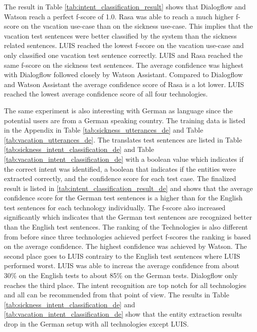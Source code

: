 The result in Table \ref{tab:intent_classification_result} shows that 
Dialogflow and Watson reach a perfect f-score of 1.0.
Rasa was able to reach a much higher f-score on the vacation use-case than 
on the sickness use-case.
This implies that the vacation test sentences were better classified by the system than
the sickness related sentences. 
LUIS reached the lowest f-score on the vacation use-case and only 
classified one vacation test sentence correctly.
LUIS and Rasa reached the same f-score on the sickness test sentences.
The average confidence was highest with Dialogflow followed 
closely by Watson Assistant.
Compared to Dialogflow and Watson Assistant the average confidence
score of Rasa is a lot lower.
LUIS reached the lowest average confidence score of all four technologies.

The same experiment is also interesting with German as language since the potential 
users are from a German speaking country.
The training data is listed in the Appendix in Table \ref{tab:sickness_utterances_de} and 
Table \ref{tab:vacation_utterances_de}.
The translates test sentences are listed in Table \ref{tab:sickness_intent_classification_de} 
and Table \ref{tab:vacation_intent_classification_de} with a boolean value which indicates if the 
correct intent was identified, a boolean that indicates if the entities were extracted correctly,
and the confidence score for each test case.
The finalized result is listed in \ref{tab:intent_classification_result_de} and shows 
that the average confidence score for the German test sentences is a higher than 
for the English test sentences for each technology individually.
The f-score also increased significantly which indicates that the German test sentences are 
recognized better than the English test sentences.
The ranking of the Technologies is also different from before since three technologies 
achieved perfect f-scores the ranking is based on the average confidence.
The highest confidence was achieved by Watson.
The second place goes to LUIS contrairy to the 
English test sentences where LUIS performed worst.
LUIS was able to increas the average confidence from about 30\% on the English tests 
to about 85\% on the German tests.
Dialogflow only reaches the third place.
The intent recognition are top notch for all technologies and all can be recommended from that 
point of view.
The results in Table \ref{tab:sickness_intent_classification_de} and \ref{tab:vacation_intent_classification_de} 
show that the entity extraction results drop in the German setup with all technologies except LUIS.
